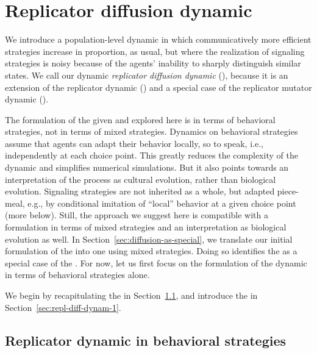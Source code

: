\documentclass[fleqn,reqno,10pt]{article}
\newcommand{\rd}{\acro{rd}} %
\newcommand{\rmd}{\acro{rmd}} %
\newcommand{\rdd}{\acro{rdd}} %
\begin{document}

\section{Replicator diffusion dynamic}
\label{sec:repl-diff-dynam}

We introduce a population-level dynamic in which communicatively more
efficient strategies increase in proportion, as usual, but where the
realization of signaling strategies is noisy because of the agents'
inability to sharply distinguish similar states. We call our dynamic
\emph{replicator diffusion dynamic} (\rdd), because it is an extension
of the replicator dynamic (\rd) and a special case of the replicator
mutator dynamic (\rmd).

The formulation of the \rdd given and explored here is in terms of
behavioral strategies, not in terms of mixed strategies. Dynamics on
behavioral strategies assume that agents can adapt
their behavior locally, so to speak, i.e., independently at each
choice point. This greatly reduces the complexity of the dynamic and
simplifies numerical simulations. But it also points towards an
interpretation of the process as cultural evolution, rather than
biological evolution. Signaling strategies are not inherited as a
whole, but adapted piece-meal, e.g., by conditional imitation of
``local'' behavior at a given choice point (more below). Still, the
approach we suggest here is compatible with a formulation in terms of
mixed strategies and an interpretation as biological evolution as
well. In Section~\ref{sec:diffusion-as-special}, we
translate our initial formulation of the \rdd
into one using mixed strategies. Doing so identifies the \rdd as a
special case of the \rmd. For now, let us first focus on the
formulation of the dynamic in terms of behavioral strategies alone.

We begin by recapitulating the \rd in
Section~\ref{sec:repl-dynam-behav}, and introduce the \rdd in
Section~\ref{sec:repl-diff-dynam-1}.

\subsection{Replicator dynamic in behavioral strategies}
\label{sec:repl-dynam-behav}
\end{document}
